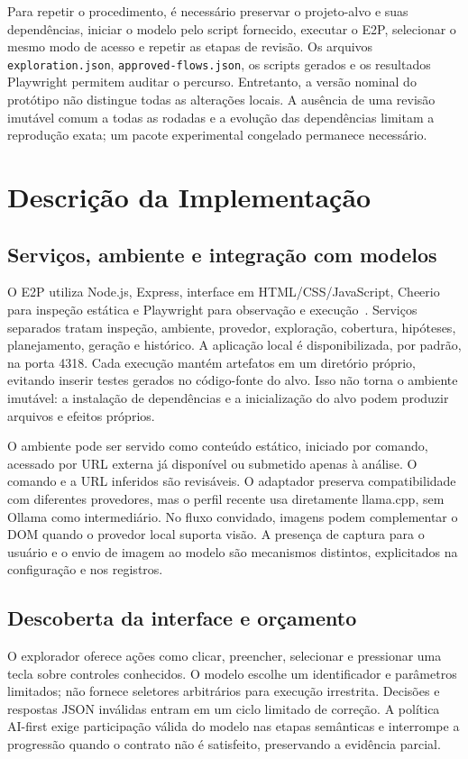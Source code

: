 \documentclass[12pt]{article}
\begin{document}
Para repetir o procedimento, é necessário preservar o projeto-alvo e suas dependências, iniciar o modelo pelo script fornecido, executar o E2P, selecionar o mesmo modo de acesso e repetir as etapas de revisão. Os arquivos \texttt{exploration.json}, \texttt{approved-flows.json}, os scripts gerados e os resultados Playwright permitem auditar o percurso. Entretanto, a versão nominal do protótipo não distingue todas as alterações locais. A ausência de uma revisão imutável comum a todas as rodadas e a evolução das dependências limitam a reprodução exata; um pacote experimental congelado permanece necessário.

\section{Descrição da Implementação}\label{sec:implementation}
\subsection{Serviços, ambiente e integração com modelos}
O E2P utiliza Node.js, Express, interface em HTML/CSS/JavaScript, Cheerio para inspeção estática e Playwright para observação e execução~\cite{microsoft2026playwright}. Serviços separados tratam inspeção, ambiente, provedor, exploração, cobertura, hipóteses, planejamento, geração e histórico. A aplicação local é disponibilizada, por padrão, na porta 4318. Cada execução mantém artefatos em um diretório próprio, evitando inserir testes gerados no código-fonte do alvo. Isso não torna o ambiente imutável: a instalação de dependências e a inicialização do alvo podem produzir arquivos e efeitos próprios.

O ambiente pode ser servido como conteúdo estático, iniciado por comando, acessado por URL externa já disponível ou submetido apenas à análise. O comando e a URL inferidos são revisáveis. O adaptador preserva compatibilidade com diferentes provedores, mas o perfil recente usa diretamente llama.cpp, sem Ollama como intermediário. No fluxo convidado, imagens podem complementar o DOM quando o provedor local suporta visão. A presença de captura para o usuário e o envio de imagem ao modelo são mecanismos distintos, explicitados na configuração e nos registros.

\subsection{Descoberta da interface e orçamento}
O explorador oferece ações como clicar, preencher, selecionar e pressionar uma tecla sobre controles conhecidos. O modelo escolhe um identificador e parâmetros limitados; não fornece seletores arbitrários para execução irrestrita. Decisões e respostas JSON inválidas entram em um ciclo limitado de correção. A política AI-first exige participação válida do modelo nas etapas semânticas e interrompe a progressão quando o contrato não é satisfeito, preservando a evidência parcial.
\end{document}
